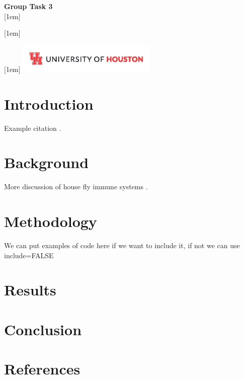 \documentclass{report}
\begin{document}
\begin{titlepage}
    \centering
    \vspace*{5cm}
    {\Huge \textbf{Group Task 3}} \\[1.5em]
        
    
        [1em]
        
    
        [1em]
        
    
        [1em]
        \vfill
    \includegraphics[width=0.5\textwidth]{UHLogo_Long.png}
    \vspace{0.8cm}
\end{titlepage}

\section{Introduction}\label{introduction}

Example citation \autocite{asgari2022}.

\newpage

\section{Background}\label{background}

More discussion of house fly immune systems \autocite{asgari2022}.

\newpage

\section{Methodology}\label{methodology}

We can put examples of code here if we want to include it, if not we can
use include=FALSE

\newpage

\section{Results}\label{results}

\newpage

\section{Conclusion}\label{conclusion}

\newpage

\section*{References}\label{references}

\printbibliography[heading=none]
\end{document}
